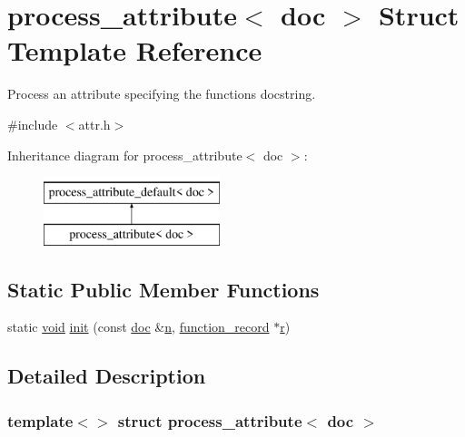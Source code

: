 \hypertarget{structprocess__attribute_3_01doc_01_4}{}\section{process\+\_\+attribute$<$ doc $>$ Struct Template Reference}
\label{structprocess__attribute_3_01doc_01_4}


Process an attribute specifying the function\textquotesingle{}s docstring.  




{\ttfamily \#include $<$attr.\+h$>$}

Inheritance diagram for process\+\_\+attribute$<$ doc $>$\+:\begin{figure}[H]
\begin{center}
\leavevmode
\includegraphics[height=2.000000cm]{structprocess__attribute_3_01doc_01_4}
\end{center}
\end{figure}
\subsection*{Static Public Member Functions}
\begin{DoxyCompactItemize}
\item 
static \mbox{\hyperlink{_s_d_l__opengles2__gl2ext_8h_ae5d8fa23ad07c48bb609509eae494c95}{void}} \mbox{\hyperlink{structprocess__attribute_3_01doc_01_4_aaa3436fb4a2436f7dbbb1d3259c17ae0}{init}} (const \mbox{\hyperlink{structdoc}{doc}} \&\mbox{\hyperlink{_s_d_l__opengl__glext_8h_ae2b4646468bc89d0ba646f5cf838e051}{n}}, \mbox{\hyperlink{structfunction__record}{function\+\_\+record}} $\ast$\mbox{\hyperlink{_s_d_l__opengl_8h_a42ce7cdc612e53abee15043f80220d97}{r}})
\end{DoxyCompactItemize}


\subsection{Detailed Description}
\subsubsection*{template$<$$>$\newline
struct process\+\_\+attribute$<$ doc $>$}

